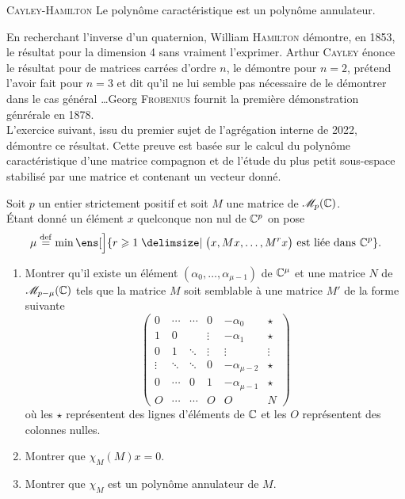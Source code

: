 \begin{theo}{\textsc{Cayley}-\textsc{Hamilton}}
    Le polynôme caractéristique est un polynôme annulateur.
\end{theo}

En recherchant l'inverse d'un quaternion, William \textsc{Hamilton} démontre, en 1853, le résultat pour la dimension 4 sans vraiment l'exprimer. Arthur \textsc{Cayley} énonce le résultat pour de matrices carrées d'ordre $n$, le démontre pour $n=2$, prétend l'avoir fait pour $n=3$ et dit qu'il ne lui semble pas nécessaire de le démontrer dans le cas général \dots Georg \textsc{Frobenius} fournit la première démonstration génrérale en 1878. \\

L'exercice suivant, issu du premier sujet de l'agrégation interne de 2022, démontre ce résultat. Cette preuve est basée sur le calcul du polynôme caractéristique d'une matrice compagnon et de l'étude du plus petit sous-espace stabilisé par une matrice et contenant un vecteur donné. \\

\begin{exercice}
    Soit $p$ un entier strictement positif et soit $M$ une matrice de $\mathscr{M}_p(\mathbb{C})$. \\
    Étant donné un élément $x$ quelconque non nul de $\mathbb{C}^p$ on pose
    $$\mu \defeq \min \ens[\Big]{ r \geqslant 1 \tq \big(x, Mx, \dots, M^r x \big) \text{ est liée dans } \C^p}.$$
    \begin{enumerate}
        \item Montrer qu'il existe un élément $(\alpha_0, \dots, \alpha_{\mu-1})$ de $\mathbb{C}^{\mu}$ et une matrice $N$ de $\mathscr{M}_{p-\mu}(\mathbb{C})$ tels que la matrice $M$ soit semblable à une matrice $M'$ de la forme suivante
        $$
        \begin{pmatrix}
        0 & \cdots & \cdots & 0 & -\alpha_0 & \star \\
        1 & 0 & & \vdots & -\alpha_1 & \star \\
        0 & 1 & \ddots & \vdots & \vdots & \vdots \\
        \vdots & \ddots & \ddots & 0 & -\alpha_{\mu-2} & \star \\
        0 & \cdots & 0 & 1 & -\alpha_{\mu-1} & \star \\
        O & \cdots & \cdots & O & O & N
        \end{pmatrix}
        $$
        où les $\star$ représentent des lignes d'éléments de $\mathbb{C}$ et les $O$ représentent des colonnes nulles. 
        \item Montrer que $\chi_M(M)x = 0$.
        \item Montrer que $\chi_M$ est un polynôme annulateur de $M$.
    \end{enumerate}
\end{exercice}


